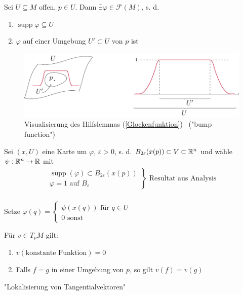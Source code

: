 \begin{hlem}
Sei $U \subseteq M$ offen, $p \in U$. Dann $\exists \varphi \in \mathcal{F}(M)$, s. d. 
\begin{enumerate}\label{Glockenfunktion}
\item$\operatorname{supp}\varphi\subseteq U$
\item$\varphi$ auf einer Umgebung $U' \subset U$ von $p$ ist
\end{enumerate}
\end{hlem}

\begin{figure}[H]
\centering 
\includegraphics[scale=0.8]{figures/tikz/bump_function.pdf}
\caption{Visualisierung des Hilfslemmas  (\ref{Glockenfunktion}) \  ("bump function") }
\end{figure}

\begin{bew}
Sei $(x, U)$ eine Karte um $\varphi$, $\varepsilon > 0$, s. d. $B_{2\varepsilon}(x(p))\subset V\subset \mathbb{R}^n$ und wähle $\psi:\mathbb{R}^n\rightarrow\mathbb{R}$ mit 
\begin{align*}
\left.
\begin{array}{r}
\operatorname{supp}(\varphi)\subset B_{2\varepsilon}(x(p))\\
\varphi = 1 \text{ auf } B_\varepsilon
\end{array}
\right\} \text{ Resultat aus Analysis}\\
\end{align*}

Setze $\varphi(q) = \left\{
\begin{array}{l}
\psi(x(q))\text{ für }q\in U\\
0 \text{ sonst}
\end{array}
\right.$
\end{bew}

\begin{satz}
Für $v\in T_p M$ gilt:
\begin{enumerate}
\item$v(\text{konstante Funktion}) = 0$
\item Falls $f = g$ in einer Umgebung von $p$, so gilt $v(f) = v(g)$
\end{enumerate}
"Lokalisierung von Tangentialvektoren"
\end{satz}

